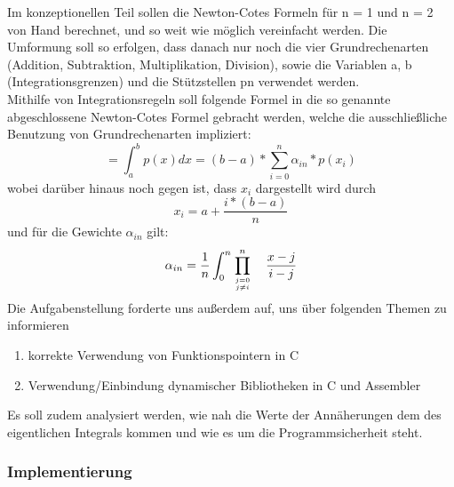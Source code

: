 \documentclass[course=erap]{aspdoc}
\begin{document}
Im konzeptionellen Teil sollen die Newton-Cotes Formeln für n = 1 und n = 2 von Hand berechnet, und so weit wie möglich vereinfacht werden. Die Umformung soll so erfolgen, dass danach nur noch die vier Grundrechenarten (Addition, Subtraktion, Multiplikation, Division), sowie die Variablen a, b (Integrationsgrenzen) und die Stützstellen p{\tiny n} verwendet werden.\\
Mithilfe von Integrationsregeln soll folgende Formel in die so genannte abgeschlossene Newton-Cotes Formel gebracht werden, welche die ausschließliche Benutzung von Grundrechenarten impliziert:
\begin{equation}
[f] = \int_{a}^{b} p(x) dx = (b-a) * \sum_{i=0}^{n} \alpha_{in} * p(x_i)
\end{equation}
wobei darüber hinaus noch gegen ist, dass $x_i$ dargestellt wird durch
\begin{equation}
x_i = a + \frac {i * (b-a)}{n}
\end{equation} 
und für die Gewichte $\alpha_{in}$ gilt: 
\begin{equation}
\alpha_{in} = \frac{1}{n} \int_{0}^{n} \prod_{j= 0\atop j \neq i}^{n}\quad \frac{x-j}{i-j}
\end{equation}
Die Aufgabenstellung forderte uns außerdem auf, uns über folgenden Themen zu informieren 
\begin{enumerate}
\item korrekte Verwendung von Funktionspointern in C
\item Verwendung/Einbindung dynamischer Bibliotheken in C und Assembler
\end {enumerate}
Es soll zudem analysiert werden, wie nah die Werte der Annäherungen dem des eigentlichen Integrals kommen und wie es um die Programmsicherheit steht.

\subsubsection{Implementierung}
\end{document}
